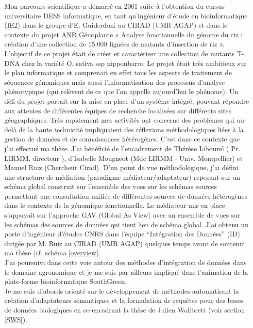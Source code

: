 Mon parcours scientifique a démarré en 2001 suite à l'obtention du cursus universitaire DESS informatique, en tant qu’ingénieur d’étude en bioinformatique (IE2) dans le groupe d’E. Guiderdoni au CIRAD (UMR AGAP) et dans le contexte du projet ANR Génoplante « Analyse fonctionnelle du génome du riz : création d'une collection de 15.000 lignées de mutants d'insertion de riz ».  L'objectif de ce projet était de créer et caractériser une collection de mutants T-DNA chez la variété O. sativa ssp nipponbarre. Le projet était très ambitieux sur le plan informatique et comprenait en effet tous les aspects de traitement de séquences génomiques mais aussi l’informatisation des processus d’analyse phénotypique (qui relèvent de ce que l’on appelle aujourd’hui le phénome). Un défi du projet portait sur la mise en place d’un système intégré, pouvant répondre aux attentes de différentes  équipes de recherche localisées sur différents sites géographiques. Très rapidement mes activités ont concerné des problèmes qui au-delà de la haute technicité impliquaient des réflexions méthodologiques liées à la gestion de données et de connaissances hétérogènes. C’est dans ce contexte que j’ai effectué ma thèse. J’ai bénéficié de l’encadrement  de Thérèse Libourel ( Pr. LIRMM, directeur ), d’Isabelle Mougneot (Mdc LIRMM - Univ. Montpellier) et Manuel Ruiz (Chercheur Cirad). D’un point de vue méthodologique, j’ai défini une structure de médiation (paradigme médiateur/adaptateur) reposant sur un schéma global construit sur l'ensemble des vues sur les schémas sources permettant une consultation unifiée de différentes sources de données hétérogènes dans le contexte de la génomique fonctionnelle. Le médiateur mis en place s’appuyait sur l’approche GAV (Global As View) avec un ensemble de vues sur les schémas des sources de données qui tient lieu de schéma global. J’ai obtenu un poste d’ingénieur d’études CNRS dans l’équipe “Intégration des Données” (ID) dirigée par M. Ruiz au CIRAD (UMR AGAP) quelques temps avant de soutenir ma thèse (cf. schéma \ref{overview}. \\

J’ai poursuivi dans cette voie autour des méthodes d’intégration de données dans le domaine agronomique et je me suis par ailleurs impliqué dans l’animation de la plate-forme bioinformatique SouthGreen.  \\
Je me suis d’abords orienté sur le développement de méthodes automatisant la création d’adaptateurs sémantiques et la formulation de requêtes pour des bases de données biologiques en co-encadrant la thèse de Julien Wollbrett (voir section \ref{SWS}).\\

